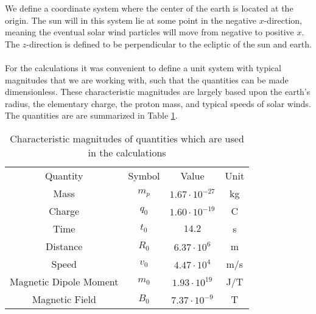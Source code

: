 We define a coordinate system where the center of the earth is located at the origin. The sun will in this system lie at some point in the negative $x$-direction, meaning the eventual solar wind particles will move from negative to positive $x$. The $z$-direction is defined to be perpendicular to the ecliptic of the sun and earth.\\
\\
For the calculations it was convenient to define a unit system with typical magnitudes that we are working with, such that the quantities can be made dimensionless. These characteristic magnitudes are largely based upon the earth's radius, the elementary charge, the proton mass, and typical speeds of solar winds. The quantities are are summarized in Table \ref{tab:characteristicMagnitudes}.

\begin{table}[h]
    \centering
    \begin{tabular}{c|c|c|c}
        Quantity & Symbol & Value & Unit\\
        Mass & $m_p$ & $1.67\cdot10^{-27}$ & kg \\
        Charge & $q_0$ & $1.60\cdot10^{-19}$ & C \\
        Time & $t_0$ & $14.2$ & s \\
        Distance & $R_0$ & $6.37\cdot 10^{6}$ & m \\
        Speed & $v_0$ & $4.47\cdot10^4$ & m/s \\
        Magnetic Dipole Moment & $m_0$ & $1.93\cdot10^{19}$ & J/T \\
        Magnetic Field & $B_0$ & $7.37\cdot10^{-9}$ & T
    \end{tabular}
    \caption{Characteristic magnitudes of quantities which are used in the calculations}
    \label{tab:characteristicMagnitudes}
\end{table}

